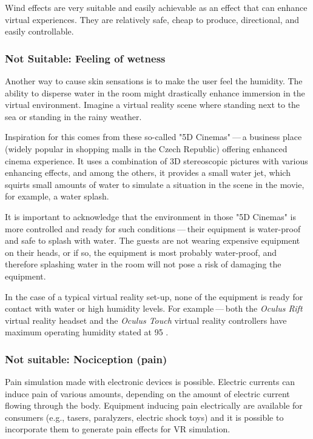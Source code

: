 Wind effects are very suitable and easily achievable as an effect that can
enhance virtual experiences. They are relatively safe, cheap to produce,
directional, and easily controllable.


\hypertarget{x-not-suitable:-feeling-of-wetness}{\subsubsection*{Not Suitable: Feeling of wetness}}
Another way to cause skin sensations is to make the user feel the humidity.
The ability to disperse water in the room might drastically enhance immersion
in the virtual environment. Imagine a virtual reality scene where standing
next to the sea or standing in the rainy weather.


Inspiration for this comes from these so-called "5D Cinemas" — a business
place (widely popular in shopping malls in the Czech Republic) offering
enhanced cinema experience. It uses a combination of 3D stereoscopic
pictures with various enhancing effects, and among the others, it provides
a small water jet, which squirts small amounts of water to simulate a
situation in the scene in the movie, for example, a water splash. \hyperlink{5dcin}{}


It is important to acknowledge that the environment in those "5D Cinemas"
is more controlled and ready for such conditions — their equipment
is water-proof and safe to splash with water. The guests are not
wearing expensive equipment on their heads, or if so, the equipment is
most probably water-proof, and therefore splashing water in the room will not
pose a risk of damaging the equipment.


In the case of a typical virtual reality set-up, none of the equipment is ready
for contact with water or high humidity levels. For example — both the
\emph{Oculus Rift} virtual reality headset and the \emph{Oculus Touch} virtual reality
controllers have maximum operating humidity stated at 95%
\hyperlink{orhswg}{}.


\hypertarget{x-not-suitable:-nociception-(pain)}{\subsubsection*{Not suitable: Nociception (pain)}}
Pain simulation made with electronic devices is possible. Electric currents can
induce pain of various amounts, depending on the amount of electric current
flowing through the body. \hyperlink{elepain}{}
Equipment inducing pain electrically are available for consumers
(e.g., tasers, paralyzers, electric shock toys) and it is possible to
incorporate them to generate pain effects for VR simulation.


